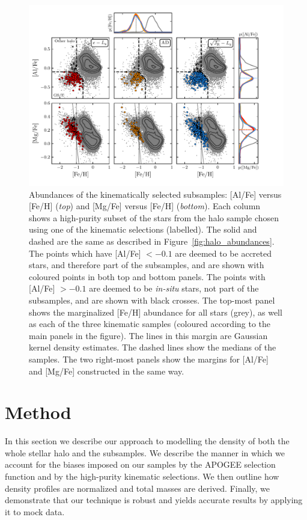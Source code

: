\begin{figure}
    \centering
    \includegraphics[width=\linewidth]{figure/ch3/kinematic_sample_abundances.pdf}
    \caption{Abundances of the kinematically selected \gse subsamples: [Al/Fe] versus [Fe/H] (\textit{top}) and [Mg/Fe] versus [Fe/H] (\textit{bottom}). Each column shows a high-purity \gse subset of the stars from the halo sample chosen using one of the kinematic selections (labelled). The solid and dashed are the same as described in Figure~\ref{fig:halo_abundances}. The points which have [Al/Fe] $< -0.1$ are deemed to be accreted stars, and therefore part of the \gse subsamples, and are shown with coloured points in both top and bottom panels. The points with [Al/Fe] $> -0.1$ are deemed to be \textit{in-situ} stars, not part of the \gse subsamples, and are shown with black crosses. The top-most panel shows the marginalized [Fe/H] abundance for all stars (grey), as well as each of the three kinematic samples (coloured according to the main panels in the figure). The lines in this margin are Gaussian kernel density estimates. The dashed lines show the medians of the samples. The two right-most panels show the margins for [Al/Fe] and [Mg/Fe] constructed in the same way.}
    \label{fig:selection_abundances}
\end{figure}

\section{Method}
\label{sec:method}

In this section we describe our approach to modelling the density of both the whole stellar halo and the \gse subsamples. We describe the manner in which we account for the biases imposed on our samples by the APOGEE selection function and by the high-purity \gse kinematic selections. We then outline how density profiles are normalized and total masses are derived. Finally, we demonstrate that our technique is robust and yields accurate results by applying it to mock data.

